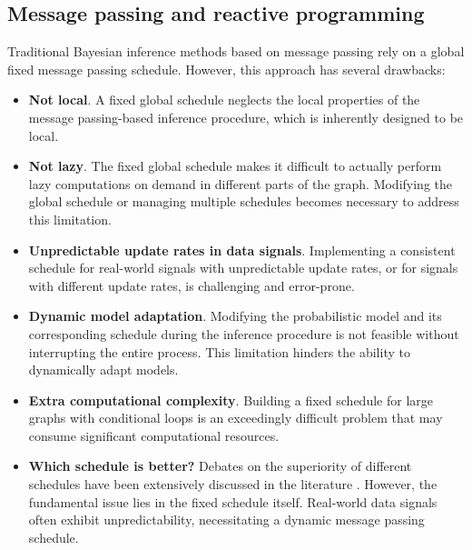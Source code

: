 \subsection{Message passing and reactive programming}


Traditional Bayesian inference methods based on message passing rely on a global fixed message
passing schedule.
However, this approach has several drawbacks:
\begin{itemize}
    \item \textbf{Not local}.
        A fixed global schedule neglects the local properties of the message passing-based inference procedure, which is inherently designed to be local.
    \item \textbf{Not lazy}.
        The fixed global schedule makes it difficult to actually perform lazy computations on demand in different parts of the graph. Modifying the global schedule or managing multiple schedules becomes necessary to address this limitation.
    \item \textbf{Unpredictable
          update rates in data signals}. Implementing a consistent schedule for real-world signals with unpredictable update rates, or for signals with different update rates, is challenging and error-prone.
    \item \textbf{Dynamic model adaptation}.
        Modifying the probabilistic model and its corresponding schedule during the inference procedure is not feasible without interrupting the entire process. This limitation hinders the ability to dynamically adapt models.
    \item \textbf{Extra computational complexity}.
        Building a fixed schedule for large graphs with conditional loops is an exceedingly difficult problem that may consume significant computational resources.
    \item \textbf{Which schedule is better?}
        Debates on the superiority of different schedules have been extensively discussed in the literature \citep{elidan_residual_2012, radosavljevic_optimized_2005, sharon_efficient_2004}.
        However, the fundamental issue lies in the fixed schedule itself.
        Real-world data signals often exhibit unpredictability, necessitating a dynamic message passing schedule.
\end{itemize}

